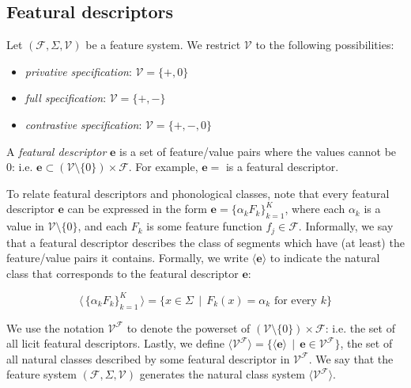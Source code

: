 \documentclass[11pt, oneside]{article}   	%
\begin{document}
\subsection{Featural descriptors}

Let $(\mathcal F, \Sigma, \mathcal V)$ be a feature system. We restrict $\mathcal V$ to the following possibilities: \begin{itemize}
    \item \textit{privative specification}: $\mathcal V = \{ +, 0 \}$
    \item \textit{full specification}: $\mathcal V = \{ +, - \}$
    \item \textit{contrastive specification}: $\mathcal V = \{ +, -, 0 \}$
    \end{itemize}

A \textit{featural descriptor} $\mathbf{e}$ is a set of feature/value pairs where the values cannot be $0$: i.e. $\mathbf{e} \subset (\mathcal V \setminus \{0\}) \times \mathcal F$. For example, $\mathbf{e} =$   is a featural descriptor.

To relate featural descriptors and phonological classes, note that every featural descriptor $\mathbf{e}$ can be expressed in the form $\mathbf{e} = \{\alpha_k F_k\}_{k=1}^K$, where each $\alpha_k$ is a value in $\mathcal V \setminus \{ 0 \}$, and each $F_k$ is some feature function $f_j \in \mathcal F$. Informally, we say that a featural descriptor describes the class of segments which have (at least) the feature/value pairs it contains. Formally, we write $\langle \mathbf{e} \rangle$ to indicate the natural class that corresponds to the featural descriptor $\mathbf{e}$:

$$ \langle \, \{\alpha_k F_k\}_{k=1}^K \, \rangle = \{x \in \Sigma \, \mid \, F_k(x) = \alpha_k \text{ for every } k \} $$

\vspace{\baselineskip} \noindent We use the notation $\mathcal V^\mathcal F$ to denote the powerset of $(\mathcal V \setminus \{0\}) \times \mathcal F$: i.e. the set of all licit featural descriptors. Lastly, we define $\langle \mathcal V^\mathcal F \rangle = \{ \langle \mathbf{e} \rangle \, \mid \, \mathbf{e} \in \mathcal V^\mathcal F \}$, the set of all natural classes described by some featural descriptor in $\mathcal V^\mathcal F$. We say that the feature system $(\mathcal F, \Sigma, \mathcal V)$ generates the natural class system $\langle \mathcal V^\mathcal F \rangle$.
\end{document}
